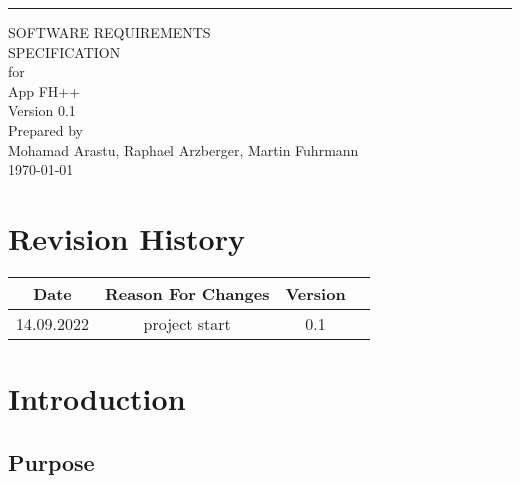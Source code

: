 \documentclass{scrreprt}
\date{}
\def\myversion{0.1 }
\begin{document}
\begin{flushright}
    \rule{16cm}{5pt}\vskip1cm
    \begin{bfseries}
        \Huge{SOFTWARE REQUIREMENTS\\ SPECIFICATION}\\
        \vspace{1.9cm}
        for\\
        \vspace{1.9cm}
        App FH++\\
        \vspace{1.9cm}
        \LARGE{Version \myversion}\\
        \vspace{1.9cm}
        Prepared by \\ {\small Mohamad Arastu, Raphael Arzberger, Martin Fuhrmann}
        \vspace{1.9cm} \\
        \today\\
    \end{bfseries}
\end{flushright}

\tableofcontents


\chapter*{Revision History}

\begin{center}
    \begin{tabular}{|c|c|c|c|}
        \hline
	    Date & Reason For Changes & Version\\
        \hline
	    14.09.2022 & project start & 0.1\\
        \hline
    \end{tabular}
\end{center}

\chapter{Introduction}

\section{Purpose}
\end{document}
